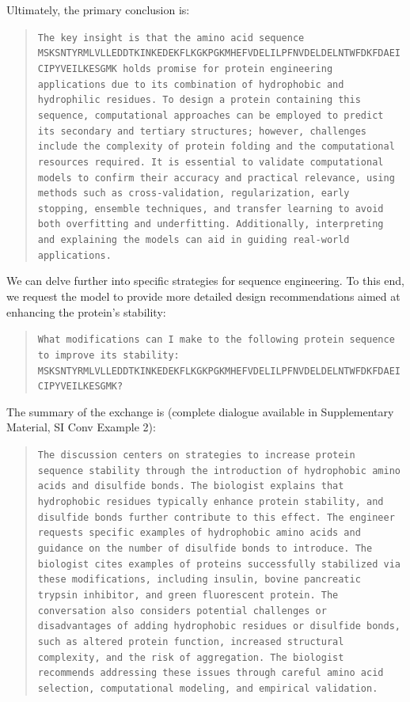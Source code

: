 Ultimately, the primary conclusion is:

\begin{quote}
\small\texttt{The key insight is that the amino acid sequence MSKSNTYRMLVLLEDDTKINKEDEKFLKGKPGKMHEFVDELILPFNVDELDELNTWFDKFDAEICIPYVEILKESGMK holds promise for protein engineering applications due to its combination of hydrophobic and hydrophilic residues. To design a protein containing this sequence, computational approaches can be employed to predict its secondary and tertiary structures; however, challenges include the complexity of protein folding and the computational resources required. It is essential to validate computational models to confirm their accuracy and practical relevance, using methods such as cross-validation, regularization, early stopping, ensemble techniques, and transfer learning to avoid both overfitting and underfitting. Additionally, interpreting and explaining the models can aid in guiding real-world applications.}
\end{quote}

We can delve further into specific strategies for sequence engineering. To this end, we request the model to provide more detailed design recommendations aimed at enhancing the protein's stability:

\begin{quote}
\small\texttt{What modifications can I make to the following protein sequence to improve its stability: MSKSNTYRMLVLLEDDTKINKEDEKFLKGKPGKMHEFVDELILPFNVDELDELNTWFDKFDAEICIPYVEILKESGMK?}
\end{quote}

The summary of the exchange is (complete dialogue available in Supplementary Material, SI Conv Example 2):

\begin{quote}
\small\texttt{The discussion centers on strategies to increase protein sequence stability through the introduction of hydrophobic amino acids and disulfide bonds. The biologist explains that hydrophobic residues typically enhance protein stability, and disulfide bonds further contribute to this effect. The engineer requests specific examples of hydrophobic amino acids and guidance on the number of disulfide bonds to introduce. The biologist cites examples of proteins successfully stabilized via these modifications, including insulin, bovine pancreatic trypsin inhibitor, and green fluorescent protein. The conversation also considers potential challenges or disadvantages of adding hydrophobic residues or disulfide bonds, such as altered protein function, increased structural complexity, and the risk of aggregation. The biologist recommends addressing these issues through careful amino acid selection, computational modeling, and empirical validation.}
\end{quote}

